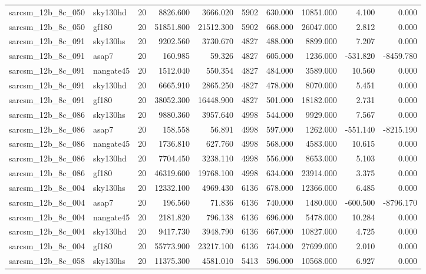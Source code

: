 \begin{tabular}{llrrrrrrrr}
sarcsm\_12b\_8c\_050 & sky130hd & 20 & 8826.600 & 3666.020 & 5902 & 630.000 & 10851.000 & 4.100 & 0.000 \\
sarcsm\_12b\_8c\_050 & gf180 & 20 & 51851.800 & 21512.300 & 5902 & 668.000 & 26047.000 & 2.812 & 0.000 \\
sarcsm\_12b\_8c\_091 & sky130hs & 20 & 9202.560 & 3730.670 & 4827 & 488.000 & 8899.000 & 7.207 & 0.000 \\
sarcsm\_12b\_8c\_091 & asap7 & 20 & 160.985 & 59.326 & 4827 & 605.000 & 1236.000 & -531.820 & -8459.780 \\
sarcsm\_12b\_8c\_091 & nangate45 & 20 & 1512.040 & 550.354 & 4827 & 484.000 & 3589.000 & 10.560 & 0.000 \\
sarcsm\_12b\_8c\_091 & sky130hd & 20 & 6665.910 & 2865.250 & 4827 & 478.000 & 8070.000 & 5.451 & 0.000 \\
sarcsm\_12b\_8c\_091 & gf180 & 20 & 38052.300 & 16448.900 & 4827 & 501.000 & 18182.000 & 2.731 & 0.000 \\
sarcsm\_12b\_8c\_086 & sky130hs & 20 & 9880.360 & 3957.640 & 4998 & 544.000 & 9929.000 & 7.567 & 0.000 \\
sarcsm\_12b\_8c\_086 & asap7 & 20 & 158.558 & 56.891 & 4998 & 597.000 & 1262.000 & -551.140 & -8215.190 \\
sarcsm\_12b\_8c\_086 & nangate45 & 20 & 1736.810 & 627.760 & 4998 & 568.000 & 4583.000 & 10.615 & 0.000 \\
sarcsm\_12b\_8c\_086 & sky130hd & 20 & 7704.450 & 3238.110 & 4998 & 556.000 & 8653.000 & 5.103 & 0.000 \\
sarcsm\_12b\_8c\_086 & gf180 & 20 & 46319.600 & 19768.100 & 4998 & 634.000 & 23914.000 & 3.375 & 0.000 \\
sarcsm\_12b\_8c\_004 & sky130hs & 20 & 12332.100 & 4969.430 & 6136 & 678.000 & 12366.000 & 6.485 & 0.000 \\
sarcsm\_12b\_8c\_004 & asap7 & 20 & 196.560 & 71.836 & 6136 & 740.000 & 1480.000 & -600.500 & -8796.170 \\
sarcsm\_12b\_8c\_004 & nangate45 & 20 & 2181.820 & 796.138 & 6136 & 696.000 & 5478.000 & 10.284 & 0.000 \\
sarcsm\_12b\_8c\_004 & sky130hd & 20 & 9417.730 & 3948.790 & 6136 & 667.000 & 10827.000 & 4.725 & 0.000 \\
sarcsm\_12b\_8c\_004 & gf180 & 20 & 55773.900 & 23217.100 & 6136 & 734.000 & 27699.000 & 2.010 & 0.000 \\
sarcsm\_12b\_8c\_058 & sky130hs & 20 & 11375.300 & 4581.010 & 5413 & 596.000 & 10568.000 & 6.927 & 0.000 \\

\end{tabular}
